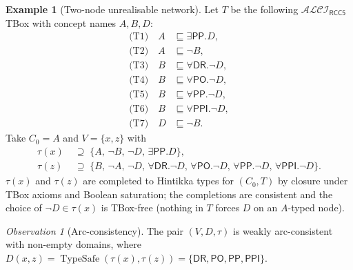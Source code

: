 \documentclass[11pt]{article}
\theoremstyle{definition}
\newtheorem{example}[theorem]{Example}
\theoremstyle{remark}
\newtheorem{observation}[theorem]{Observation}
\newcommand{\DR}{\mathsf{DR}}
\newcommand{\PO}{\mathsf{PO}}
\newcommand{\PP}{\mathsf{PP}}
\newcommand{\PPI}{\mathsf{PPI}}
\newcommand{\RCC}{\{\DR,\PO,\PP,\PPI\}}
\newcommand{\TypeSafe}{\operatorname{TypeSafe}}
\newcommand{\ALCIRCC}[1]{\mathcal{ALCI}_{\mathsf{RCC#1}}}
\begin{document}
\begin{example}[Two-node unrealisable network]
\label{ex:two-node}
Let $T$ be the following $\ALCIRCC{5}$ TBox with concept names
$A, B, D$:
\begin{align*}
  \text{(T1)} \quad A &\sqsubseteq \exists \PP. D, \\
  \text{(T2)} \quad A &\sqsubseteq \neg B, \\
  \text{(T3)} \quad B &\sqsubseteq \forall \DR. \neg D, \\
  \text{(T4)} \quad B &\sqsubseteq \forall \PO. \neg D, \\
  \text{(T5)} \quad B &\sqsubseteq \forall \PP. \neg D, \\
  \text{(T6)} \quad B &\sqsubseteq \forall \PPI. \neg D, \\
  \text{(T7)} \quad D &\sqsubseteq \neg B.
\end{align*}
Take $C_0 = A$ and $V = \{x, z\}$ with
\begin{align*}
  \tau(x) &\;\supseteq\; \{A,\, \neg B,\, \neg D,\, \exists \PP. D\}, \\
  \tau(z) &\;\supseteq\; \{B,\, \neg A,\, \neg D,\,
      \forall \DR. \neg D,\, \forall \PO. \neg D,\,
      \forall \PP. \neg D,\, \forall \PPI. \neg D\}.
\end{align*}
$\tau(x)$ and $\tau(z)$ are completed to Hintikka types for $(C_0, T)$
by closure under TBox axioms and Boolean saturation; the completions
are consistent and the choice of $\neg D \in \tau(x)$ is TBox-free
(nothing in $T$ forces $D$ on an $A$-typed node).
\end{example}

\begin{observation}[Arc-consistency]
\label{obs:ac}
The pair $(V, D, \tau)$ is weakly arc-consistent with non-empty
domains, where $D(x, z) = \TypeSafe(\tau(x), \tau(z)) = \RCC$.
\end{observation}
\end{document}
